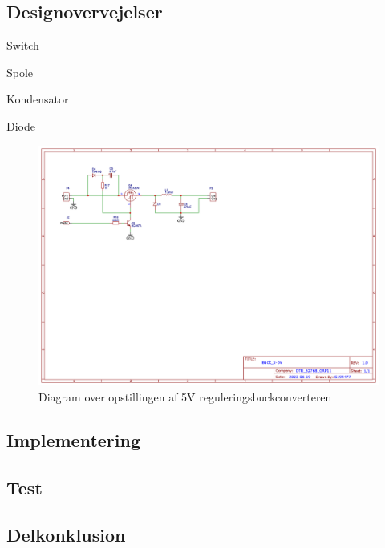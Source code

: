 \documentclass[../main.tex]{subfiles}
\begin{document}
    \subsection{Designovervejelser}
        
        Switch
        
        Spole
        
        Kondensator
        
        Diode
        
        
        \begin{figure}[H]
            \includegraphics[width=\textwidth]{Dokumentation/Figures/PV_Buck_x-5V.png}
            \caption{Diagram over opstillingen af 5V reguleringsbuckconverteren}
            \label{fig: Testresultater MPPT-Buckconverter}
        \end{figure}

            
    \subsection{Implementering}
        
    \subsection{Test}
        
    \subsection{Delkonklusion}
        
        
\end{document}
